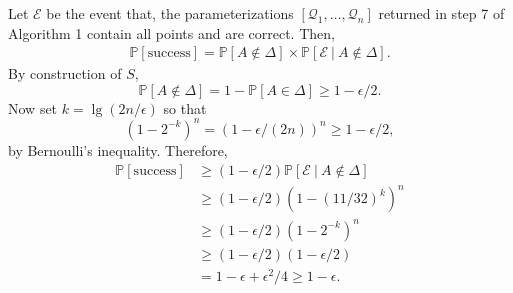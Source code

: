 \documentclass[sigconf]{acmart}
\def\pr{\mathbb{P}}
\begin{document}
Let $\mathscr{E}$ be the event that, the parameterizations $[\mathscr{Q}_1,\hdots,\mathscr{Q}_n]$ returned in step 7 of Algorithm 1 contain all points and are correct. Then, 
\begin{align*}
\pr[\textrm{success}] = \pr[A \not\in \Delta] \times \pr[\mathscr{E}~|~A \not\in \Delta].  
\end{align*}
By construction of $S$,
\[
\pr[A \not\in \Delta] = 1-\pr[A \in \Delta] \geq
1-\epsilon/2.
\]
Now set $k = \lg(2n/\epsilon)$ so that 
\[
(1-2^{-k})^n = (1 - \epsilon/(2n))^n \geq 1 - \epsilon/2,
\]
by Bernoulli's inequality. Therefore, 
\begin{align*}
\pr[\textrm{success}] &\geq  (1-\epsilon/2)\pr[\mathscr{E}~|~A \not\in \Delta]\\
&\geq (1-\epsilon/2)(1-(11/32)^k)^n\\
& \geq (1-\epsilon/2)(1-2^{-k})^n \\
& \geq (1-\epsilon/2)(1-\epsilon/2)\\
& = 1 - \epsilon + \epsilon^2/4 \geq 1- \epsilon.
\end{align*}


\end{document}
